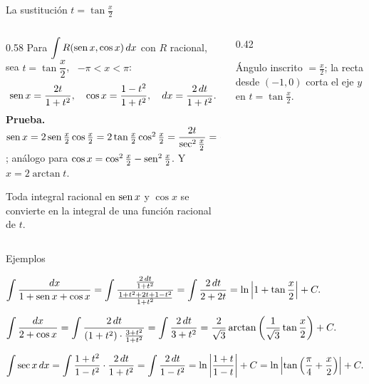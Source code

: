 \documentclass[10pt,aspectratio=169]{beamer}
\begin{document}
\begin{frame}{La sustitución $t=\tan\frac x2$}
  \begin{columns}
    \begin{column}{0.58\textwidth}
      Para $\displaystyle\int R(\operatorname{sen} x,\cos x)\,dx$ con $R$ racional, sea $t=\tan\dfrac x2$, \ $-\pi<x<\pi$:
      \[ \operatorname{sen} x=\frac{2t}{1+t^2},\quad \cos x=\frac{1-t^2}{1+t^2},\quad dx=\frac{2\,dt}{1+t^2}. \]
      \textbf{Prueba.} $\operatorname{sen} x=2\operatorname{sen}\frac x2\cos\frac x2=2\tan\frac x2\cos^2\frac x2=\dfrac{2t}{\sec^2\frac x2}=\dfrac{2t}{1+t^2}$;
      análogo para $\cos x=\cos^2\frac x2-\operatorname{sen}^2\frac x2$. Y $x=2\arctan t$.
      \begin{idea}
        Toda integral racional en $\operatorname{sen} x$ y $\cos x$ se convierte en la integral de una función racional de $t$.
      \end{idea}
    \end{column}
    \begin{column}{0.42\textwidth}
      \centering

      \small Ángulo inscrito $=\frac x2$; la recta desde $(-1,0)$ corta el eje $y$ en $t=\tan\frac x2$.
    \end{column}
  \end{columns}
\end{frame}

\begin{frame}{Ejemplos}
  \begin{ejemplo}[8]
    $\displaystyle\int\frac{dx}{1+\operatorname{sen} x+\cos x}=\int\frac{\frac{2\,dt}{1+t^2}}{\frac{1+t^2+2t+1-t^2}{1+t^2}}=\int\frac{2\,dt}{2+2t}
      =\ln\left|1+\tan\frac x2\right|+C.$
  \end{ejemplo}
  \begin{ejemplo}[9]
    $\displaystyle\int\frac{dx}{2+\cos x}=\int\frac{2\,dt}{(1+t^2)\cdot\frac{3+t^2}{1+t^2}}=\int\frac{2\,dt}{3+t^2}
      =\frac{2}{\sqrt3}\arctan\left(\frac{1}{\sqrt3}\tan\frac x2\right)+C.$
  \end{ejemplo}
  \begin{ejemplo}[10]
    $\displaystyle\int\sec x\,dx=\int\frac{1+t^2}{1-t^2}\cdot\frac{2\,dt}{1+t^2}=\int\frac{2\,dt}{1-t^2}=\ln\left|\frac{1+t}{1-t}\right|+C
      =\ln\left|\tan\left(\frac\pi4+\frac x2\right)\right|+C.$
  \end{ejemplo}
\end{frame}
\end{document}
